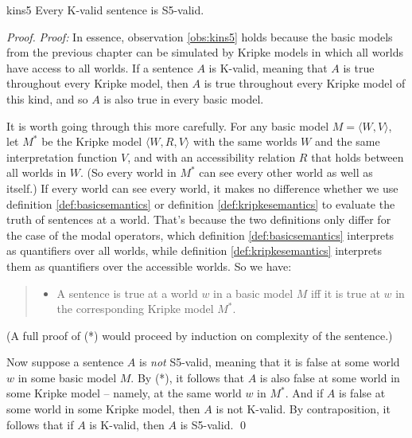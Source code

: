 \begin{observation}{kins5}
  Every K-valid sentence is S5-valid.
\end{observation}
%
\begin{proof}
  \emph{Proof:} In essence, observation \ref{obs:kins5} holds because the basic
  models from the previous chapter can be simulated by Kripke models in which
  all worlds have access to all worlds. If a sentence $A$ is K-valid, meaning
  that $A$ is true throughout every Kripke model, then $A$ is true throughout
  every Kripke model of this kind, and so $A$ is also true in every basic model.

  It is worth going through this more carefully. For any basic model
  $M = \langle W,V \rangle$, let $M^*$ be the Kripke model
  $\langle W,R,V \rangle$ with the same worlds $W$ and the same interpretation
  function $V$, and with an accessibility relation $R$ that holds between all
  worlds in $W$. (So every world in $M^*$ can see every other world as well
  as itself.) If every world can see every world, it makes no difference
  whether we use definition \ref{def:basicsemantics} or definition
  \ref{def:kripkesemantics} to evaluate the truth of sentences at a world.
  That's because the two definitions only differ for the case of the modal
  operators, which definition \ref{def:basicsemantics} interprets as quantifiers
  over all worlds, while definition \ref{def:kripkesemantics} interprets them as
  quantifiers over the accessible worlds. So we have:
  \begin{quote}
  \begin{itemize}
  \item[(*)] A sentence is true at a world $w$ in a basic model $M$ iff
    it is true at $w$ in the corresponding Kripke model $M^*$.
  \end{itemize}
  \end{quote}

  (A full proof of (*) would proceed by induction on complexity of the
  sentence.)

  Now suppose a sentence $A$ is \emph{not} S5-valid, meaning that it is false at
  some world $w$ in some basic model $M$. By (*), it follows that $A$ is also
  false at some world in some Kripke model -- namely, at the same world $w$ in
  $M^*$. And if $A$ is false at some world in some Kripke model, then $A$ is not
  K-valid. By contraposition, it follows that if $A$ is K-valid, then $A$ is
  S5-valid. \qed
\end{proof}

